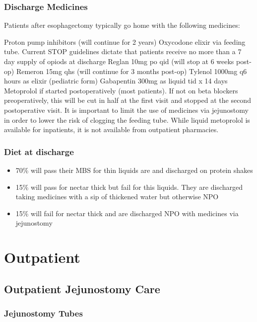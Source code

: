\documentclass[
  letterpaper,
]{scrbook}
\providecommand{\tightlist}{%
  \setlength{\itemsep}{0pt}\setlength{\parskip}{0pt}}
\begin{document}
\section{Discharge Medicines}\label{discharge-medicines}

Patients after esophagectomy typically go home with the following
medicines:

Proton pump inhibitors (will continue for 2 years) Oxycodone elixir via
feeding tube. Current STOP guidelines dictate that patients receive no
more than a 7 day supply of opiods at discharge Reglan 10mg po qid (will
stop at 6 weeks post-op) Remeron 15mg qhs (will continue for 3 months
post-op) Tylenol 1000mg q6 hours as elixir (pediatric form) Gabapentin
300mg as liquid tid x 14 days Metoprolol if started postoperatively
(most patients). If not on beta blockers preoperatively, this will be
cut in half at the first visit and stopped at the second postoperative
visit. It is important to limit the use of medicines via jejunostomy in
order to lower the risk of clogging the feeding tube. While liquid
metoprolol is available for inpatients, it is not available from
outpatient pharmacies.

\section{Diet at discharge}\label{diet-at-discharge}

\begin{itemize}
\tightlist
\item
  70\% will pass their MBS for thin liquids are and discharged on
  protein shakes
\item
  15\% will pass for nectar thick but fail for this liquids. They are
  discharged taking medicines with a sip of thickened water but
  otherwise NPO
\item
  15\% will fail for nectar thick and are discharged NPO with medicines
  via jejunostomy
\end{itemize}

\part{Outpatient}

\chapter{Outpatient Jejunostomy Care}\label{outpt_jejunostomy}

\section{Jejunostomy Tubes}\label{jejunostomy-tubes}
\end{document}

